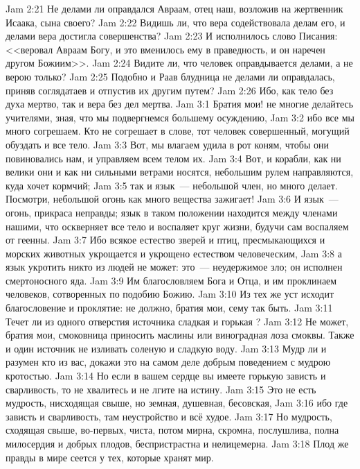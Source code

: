 \vs Jam 2:21 Не делами ли оправдался Авраам, отец наш, возложив на жертвенник Исаака, сына своего?
\vs Jam 2:22 Видишь ли, что вера содействовала делам его, и делами вера достигла совершенства?
\vs Jam 2:23 И исполнилось слово Писания: <<веровал Авраам Богу, и это вменилось ему в праведность, и он наречен другом Божиим>>.
\vs Jam 2:24 Видите ли, что человек оправдывается делами, а не верою только?
\vs Jam 2:25 Подобно и Раав блудница не делами ли оправдалась, приняв соглядатаев и отпустив их другим путем?
\vs Jam 2:26 Ибо, как тело без духа мертво, так и вера без дел мертва.
\vs Jam 3:1 Братия мои! не многие делайтесь учителями, зная, что мы подвергнемся большему осуждению,
\vs Jam 3:2 ибо все мы много согрешаем. Кто не согрешает в слове, тот человек совершенный, могущий обуздать и все тело.
\vs Jam 3:3 Вот, мы влагаем удила в рот коням, чтобы они повиновались нам, и управляем всем телом их.
\vs Jam 3:4 Вот, и корабли, как ни велики они и как ни сильными ветрами носятся, небольшим рулем направляются, куда хочет кормчий;
\vs Jam 3:5 так и язык~--- небольшой член, но много делает. Посмотри, небольшой огонь как много вещества зажигает!
\vs Jam 3:6 И язык~--- огонь, прикраса неправды; язык в таком положении находится между членами нашими, что оскверняет все тело и воспаляет круг жизни, будучи сам воспаляем от геенны.
\vs Jam 3:7 Ибо всякое естество зверей и птиц, пресмыкающихся и морских животных укрощается и укрощено естеством человеческим,
\vs Jam 3:8 а язык укротить никто из людей не может: это~--- неудержимое зло; он исполнен смертоносного яда.
\vs Jam 3:9 Им благословляем Бога и Отца, и им проклинаем человеков, сотворенных по подобию Божию.
\vs Jam 3:10 Из тех же уст исходит благословение и проклятие: не должно, братия мои, сему так быть.
\vs Jam 3:11 Течет ли из одного отверстия источника сладкая и горькая ?
\vs Jam 3:12 Не может, братия мои, смоковница приносить маслины или виноградная лоза смоквы. Также и один источник не  изливать соленую и сладкую воду.
\rsbpar\vs Jam 3:13 Мудр ли и разумен кто из вас, докажи это на самом деле добрым поведением с мудрою кротостью.
\vs Jam 3:14 Но если в вашем сердце вы имеете горькую зависть и сварливость, то не хвалитесь и не лгите на истину.
\vs Jam 3:15 Это не есть мудрость, нисходящая свыше, но земная, душевная, бесовская,
\vs Jam 3:16 ибо где зависть и сварливость, там неустройство и всё худое.
\vs Jam 3:17 Но мудрость, сходящая свыше, во-первых, чиста, потом мирна, скромна, послушлива, полна милосердия и добрых плодов, беспристрастна и нелицемерна.
\vs Jam 3:18 Плод же правды в мире сеется у тех, которые хранят мир.
